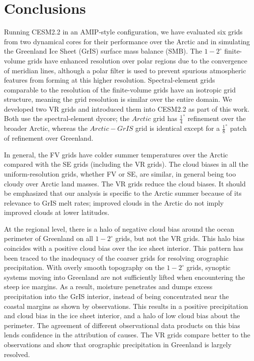 \documentclass[draft]{agujournal2019}
\begin{document}
\section{Conclusions}\label{sec:conclusions}

Running CESM2.2 in an AMIP-style configuration, we have evaluated six grids from two dynamical cores for their performance over the Arctic and in simulating the Greenland Ice Sheet (GrIS) surface mass balance (SMB). The $1-2^{\circ}$ finite-volume grids have enhanced resolution over polar regions due to the convergence of meridian lines, although a polar filter is used to prevent spurious atmospheric features from forming at this higher resolution. Spectral-element grids comparable to the resolution of the finite-volume grids have an isotropic grid structure, meaning the grid resolution is similar over the entire domain.
We developed two VR grids and introduced them into CESM2.2 as part of this work. Both use the spectral-element dycore; the $Arctic$ grid has $\frac{1}{4}^{\circ}$ refinement over the broader Arctic, whereas the $Arctic-GrIS$ grid is identical except for a $\frac{1}{8}^{\circ}$ patch of refinement over Greenland.

In general, the FV grids have colder summer temperatures over the Arctic compared with the SE grids (including the VR grids). The cloud biases in all the uniform-resolution grids, whether FV or SE, are similar, in general being too cloudy over Arctic land masses. The VR grids reduce the cloud biases. It should be emphasized that our analysis is specific to the Arctic summer because of its relevance to GrIS melt rates; improved clouds in the Arctic do not imply improved clouds at lower latitudes.

At the regional level, there is a halo of negative cloud bias around the ocean perimeter of Greenland on all $1-2^{\circ}$ grids, but not the VR grids. This halo bias coincides with a positive cloud bias over the ice sheet interior. This pattern has been traced to the inadequacy of the coarser grids for resolving orographic precipitation.  With overly smooth topography on the $1-2^{\circ}$ grids, synoptic systems moving into Greenland are not sufficiently lifted when encountering the steep ice margins.
As a result, moisture penetrates and dumps excess precipitation into the GrIS interior, instead of being concentrated near the coastal margins as shown by observations. This results in a positive precipitation and cloud bias in the ice sheet interior, and a halo of low cloud bias about the perimeter. The agreement of different observational data products on this bias lends confidence in the attribution of causes.
The VR grids compare better to the observations and show that orographic precipitation in Greenland is largely resolved.
\end{document}

